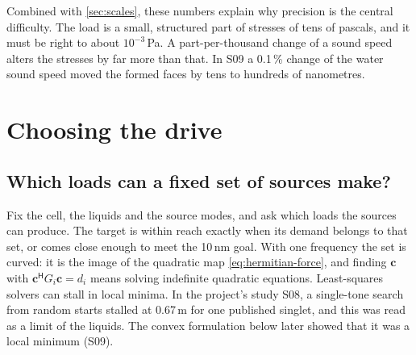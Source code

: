 \documentclass[11pt,a4paper]{article}
\numberwithin{equation}{section}
\begin{document}
Combined with \cref{sec:scales}, these numbers explain why precision is the
central difficulty. The load is a small, structured part of stresses of tens of
pascals, and it must be right to about $10^{-3}$\,Pa. A part-per-thousand
change of a sound speed alters the stresses by far more than that. In S09 a
0.1\,\% change of the water sound speed moved the formed faces by tens to
hundreds of nanometres.

\section{Choosing the drive}\label{sec:drive}

\subsection{Which loads can a fixed set of sources make?}
Fix the cell, the liquids and the source modes, and ask which loads the
sources can produce. The target is within reach exactly when its demand belongs
to that set, or comes close enough to meet the 10\,nm goal. With one frequency
the set is curved: it is the image of the quadratic map \cref{eq:hermitian-force},
and finding $\bm c$ with $\bm c^{\mathsf H}G_i\bm c=d_i$ means solving
indefinite quadratic equations. Least-squares solvers can stall in local
minima. In the project's study S08, a single-tone search from random starts
stalled at 0.67\,\textmu m for one published singlet, and this was read as a
limit of the liquids. The convex formulation below later showed that it was a
local minimum (S09).
\end{document}
